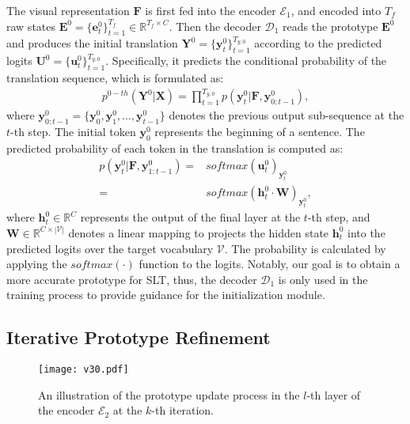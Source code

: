 \documentclass[10pt,twocolumn,letterpaper]{article}
\begin{document}
    
    
    The visual representation $\bm{F}$ is first fed into the encoder $\mathcal{E}_1$, and encoded into $T_f$ raw states $\bm{E}^0=\{\bm{e}^0_t\}_{t=1}^{T_f}\in \mathbb{R}^{T_f\times C}$. Then the decoder $\mathcal{D}_1$ reads the prototype $\bm{E}^0$ and produces the initial translation $\bm{Y}^0=\{\bm{y}^0_t\}_{t=1}^{T_{y,0}}$ according to the predicted logits $\bm{U}^0=\{\bm{u}^0_t\}_{t=1}^{T_{y,0}}$. 
    Specifically, it predicts the conditional probability of the translation sequence, which is formulated as: \vspace{-1mm}
    \begin{equation}
    \begin{aligned}
    \label{equ:2}
    p^{0-th}(\bm{Y}^0|\bm{X})=\prod_{t=1}^{T_{y,0}}p(\bm{y}^0_t|\bm{F},\bm{y}^0_{0:t-1}),
    \end{aligned}
    \end{equation}
    where $\bm{y}^0_{0:t-1}=\{\bm{y}^0_0, \bm{y}^0_1, \dots, \bm{y}^0_{t-1}\}$ denotes the previous output sub-sequence at the $t$-th step. The initial token $\bm{y}^0_0$ represents the beginning of a sentence.
    The predicted probability of each token in the translation is computed as:\vspace{-1mm}
    \begin{equation}
    \begin{aligned}
    \label{equ:3}
    p(\bm{y}^0_t|\bm{F},\bm{y}^0_{1:t-1})=&softmax(\bm{u}^0_t)_{\bm{y}^0_t}\\
    =&softmax(\bm{h}^0_t\cdot\bm{W})_{\bm{y}^0_t},
    \end{aligned}
    \end{equation}
    where $\bm{h}^0_t\in\mathbb{R}^{C}$ represents the output of the final layer at the $t$-th step, and $\bm{W}\in\mathbb{R}^{C\times \left |\mathcal{V}\right |}$ denotes a linear mapping to projects the hidden state $\bm{h}^0_t$ into the predicted logits over the target vocabulary $\mathcal{V}$. The probability is calculated by applying the $softmax(\cdot)$ function to the logits.
    Notably, our goal is to obtain a more accurate prototype for SLT, thus, the decoder $\mathcal{D}_1$ is only used in the training process to provide guidance for the initialization module.

    \subsection{Iterative Prototype Refinement}
    
    \begin{figure}
    \centering
    \texttt{[image: v30.pdf]}
    \caption{An illustration of the prototype update process in the $l$-th layer of the encoder $\mathcal{E}_2$ at the $k$-th iteration.
    }
    \label{fig3}
    \end{figure}
    
\end{document}

